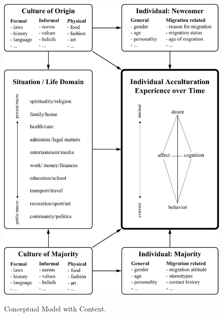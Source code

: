 \documentclass[man, 12pt, a4paper]{apa7}
\begin{document}
\begin{figure}[h]
\centering
\caption{Conceptual Model with Context.}
\includegraphics[width=\textwidth]{Figures/ConceptualFrameworkStatic.pdf}
\label{fig:SupModelContext}
\end{figure}
\end{document}
